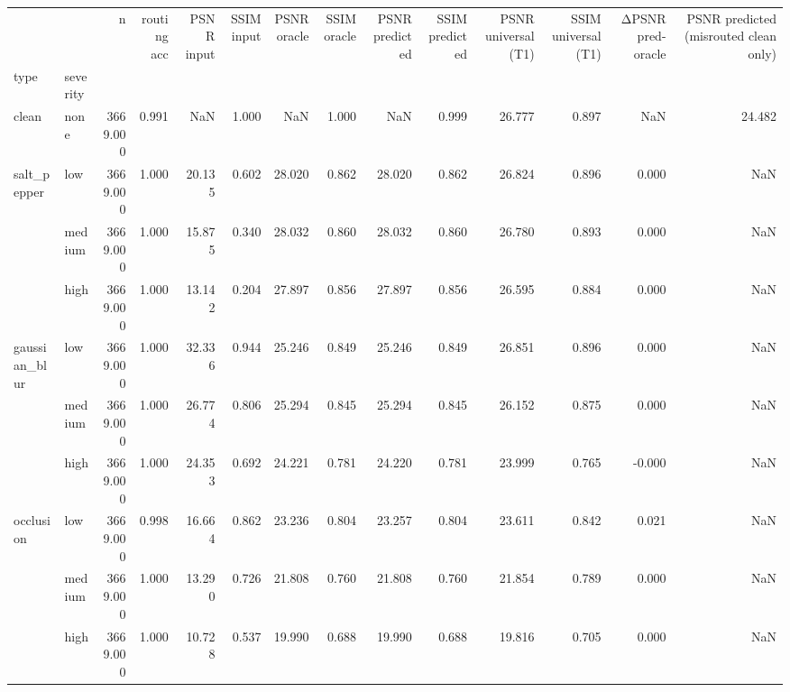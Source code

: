 \begin{tabular}{llrrrrrrrrrrrr}
\toprule
 &  & n & routing acc & PSNR input & SSIM input & PSNR oracle & SSIM oracle & PSNR predicted & SSIM predicted & PSNR universal (T1) & SSIM universal (T1) & ΔPSNR pred-oracle & PSNR predicted (misrouted clean only) \\
type & severity &  &  &  &  &  &  &  &  &  &  &  &  \\
\midrule
clean & none & 3669.000 & 0.991 & NaN & 1.000 & NaN & 1.000 & NaN & 0.999 & 26.777 & 0.897 & NaN & 24.482 \\
\cline{1-14}
\multirow[t]{3}{*}{salt_pepper} & low & 3669.000 & 1.000 & 20.135 & 0.602 & 28.020 & 0.862 & 28.020 & 0.862 & 26.824 & 0.896 & 0.000 & NaN \\
 & medium & 3669.000 & 1.000 & 15.875 & 0.340 & 28.032 & 0.860 & 28.032 & 0.860 & 26.780 & 0.893 & 0.000 & NaN \\
 & high & 3669.000 & 1.000 & 13.142 & 0.204 & 27.897 & 0.856 & 27.897 & 0.856 & 26.595 & 0.884 & 0.000 & NaN \\
\cline{1-14}
\multirow[t]{3}{*}{gaussian_blur} & low & 3669.000 & 1.000 & 32.336 & 0.944 & 25.246 & 0.849 & 25.246 & 0.849 & 26.851 & 0.896 & 0.000 & NaN \\
 & medium & 3669.000 & 1.000 & 26.774 & 0.806 & 25.294 & 0.845 & 25.294 & 0.845 & 26.152 & 0.875 & 0.000 & NaN \\
 & high & 3669.000 & 1.000 & 24.353 & 0.692 & 24.221 & 0.781 & 24.220 & 0.781 & 23.999 & 0.765 & -0.000 & NaN \\
\cline{1-14}
\multirow[t]{3}{*}{occlusion} & low & 3669.000 & 0.998 & 16.664 & 0.862 & 23.236 & 0.804 & 23.257 & 0.804 & 23.611 & 0.842 & 0.021 & NaN \\
 & medium & 3669.000 & 1.000 & 13.290 & 0.726 & 21.808 & 0.760 & 21.808 & 0.760 & 21.854 & 0.789 & 0.000 & NaN \\
 & high & 3669.000 & 1.000 & 10.728 & 0.537 & 19.990 & 0.688 & 19.990 & 0.688 & 19.816 & 0.705 & 0.000 & NaN \\
\cline{1-14}
\bottomrule
\end{tabular}
